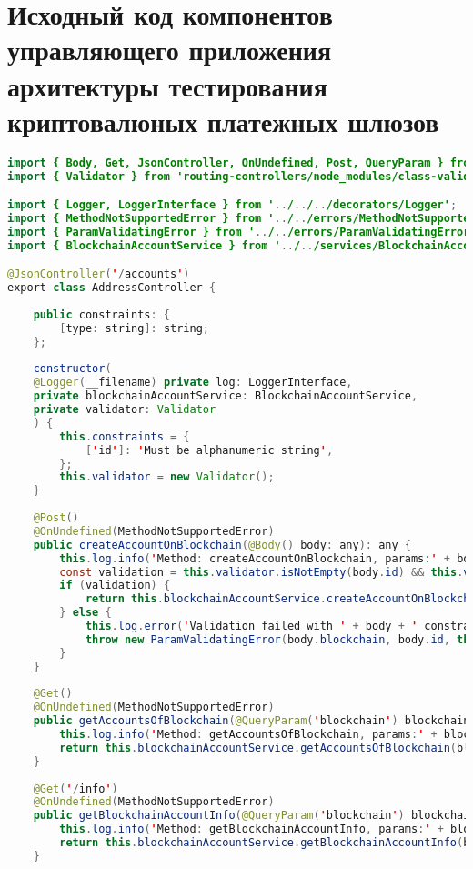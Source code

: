 \section{Исходный код компонентов управляющего приложения архитектуры тестирования криптовалюных платежных шлюзов}\label{app:B2}
\begin{lstlisting}[language=java]
import { Body, Get, JsonController, OnUndefined, Post, QueryParam } from 'routing-controllers';
import { Validator } from 'routing-controllers/node_modules/class-validator';

import { Logger, LoggerInterface } from '../../../decorators/Logger';
import { MethodNotSupportedError } from '../../errors/MethodNotSupportedError';
import { ParamValidatingError } from '../../errors/ParamValidatingError';
import { BlockchainAccountService } from '../../services/BlockchainAccountService';

@JsonController('/accounts')
export class AddressController {
	
	public constraints: {
		[type: string]: string;
	};
	
	constructor(
	@Logger(__filename) private log: LoggerInterface,
	private blockchainAccountService: BlockchainAccountService,
	private validator: Validator
	) {
		this.constraints = {
			['id']: 'Must be alphanumeric string',
		};
		this.validator = new Validator();
	}
	
	@Post()
	@OnUndefined(MethodNotSupportedError)
	public createAccountOnBlockchain(@Body() body: any): any {
		this.log.info('Method: createAccountOnBlockchain, params:' + body);
		const validation = this.validator.isNotEmpty(body.id) && this.validator.isAlphanumeric(body.id);
		if (validation) {
			return this.blockchainAccountService.createAccountOnBlockchain(body);
		} else {
			this.log.error('Validation failed with ' + body + ' constraints: ' + this.constraints);
			throw new ParamValidatingError(body.blockchain, body.id, this.constraints);
		}
	}
	
	@Get()
	@OnUndefined(MethodNotSupportedError)
	public getAccountsOfBlockchain(@QueryParam('blockchain') blockchain: string): any {
		this.log.info('Method: getAccountsOfBlockchain, params:' + blockchain);
		return this.blockchainAccountService.getAccountsOfBlockchain(blockchain);
	}
	
	@Get('/info')
	@OnUndefined(MethodNotSupportedError)
	public getBlockchainAccountInfo(@QueryParam('blockchain') blockchain: string, @QueryParam('id') id: string): any {
		this.log.info('Method: getBlockchainAccountInfo, params:' + blockchain + ' ' + id);
		return this.blockchainAccountService.getBlockchainAccountInfo(blockchain, id);
	}
	

\end{lstlisting}
